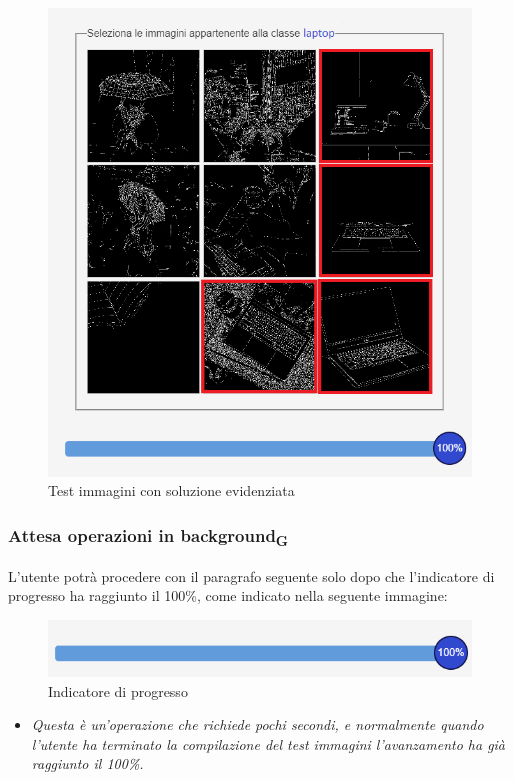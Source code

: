 \begin{figure}[H]
    \centering
    \includegraphics[scale=0.6]{src/img/computerlaptopevidenziati.png}
    \caption{Test immagini con soluzione evidenziata}
\end{figure}

\subsubsection{Attesa operazioni in background\textsubscript{G}}
L'utente potrà procedere con il paragrafo seguente solo dopo che l'indicatore di progresso ha raggiunto il 100\%, come indicato nella seguente immagine:
\begin{figure}[H]
    \centering
    \includegraphics[scale=0.8]{img/barra.png}
    \caption{Indicatore di progresso}
\end{figure}    

\begin{itemize}
	\item \textit{Questa è un'operazione che richiede pochi secondi, e normalmente quando l'utente ha terminato la compilazione del test immagini l'avanzamento ha già raggiunto il 100\%.}
\end{itemize} 

